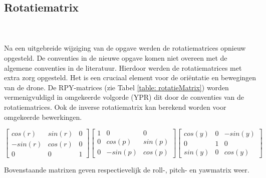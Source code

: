\subsection{Rotatiematrix}
\\\\
Na een uitgebreide wijziging van de opgave werden de rotatiematrices opnieuw opgesteld. De conventies in de nieuwe opgave komen niet overeen met de algemene conventies in de literatuur. Hierdoor werden de rotatiematrices met extra zorg opgesteld. Het is een cruciaal element voor de ori\"entatie en bewegingen van de drone.
\noindent
De RPY-matrices (zie Tabel \ref{table: rotatieMatrix}) worden vermenigvuldigd in omgekeerde volgorde (YPR) dit door de conventies van de rotatiematrices. Ook de inverse rotatiematrix kan berekend worden voor omgekeerde bewerkingen.
\begin{table}[h]
	\centering
	\(
	\begin{bmatrix} 
	cos(r) & sin(r) & 0 \\ 
	-sin(r) & cos(r) & 0 \\
	0 & 0 & 1
	\end{bmatrix}
	\begin{bmatrix} 
	1 & 0 & 0 \\ 
	0 & cos(p) & sin(p) \\
	0 & -sin(p) & cos(p)
	\end{bmatrix}
	\begin{bmatrix} 
	cos(y) & 0 & -sin(y) \\ 
	0 & 1 & 0 \\
	sin(y) & 0 & cos(y)
	\end{bmatrix}
	\)
	\caption{Bovenstaande matrixen geven respectievelijk de roll-, pitch- en yawmatrix weer.}
	\label{table: rotatieMatrix}
\end{table}